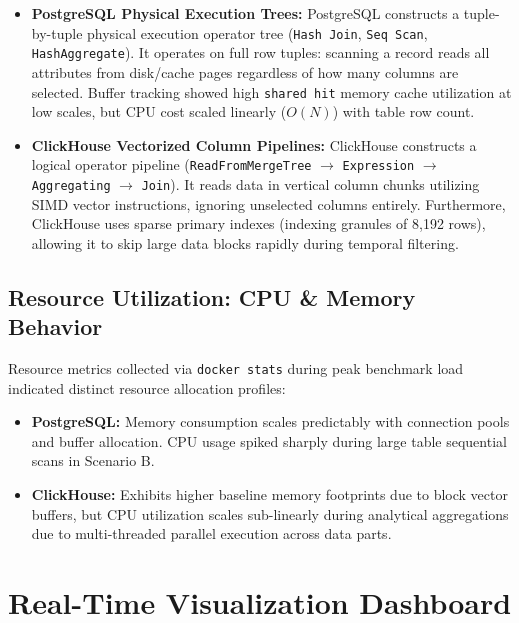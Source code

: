 \documentclass[peerreviewca]{IEEEtran}
\begin{document}
\begin{itemize}
    \item \textbf{PostgreSQL Physical Execution Trees:} PostgreSQL constructs a tuple-by-tuple physical execution operator tree (\texttt{Hash Join}, \texttt{Seq Scan}, \texttt{HashAggregate}). It operates on full row tuples: scanning a record reads all attributes from disk/cache pages regardless of how many columns are selected. Buffer tracking showed high \texttt{shared hit} memory cache utilization at low scales, but CPU cost scaled linearly ($O(N)$) with table row count.
    
    \item \textbf{ClickHouse Vectorized Column Pipelines:} ClickHouse constructs a logical operator pipeline (\texttt{ReadFromMergeTree} $\rightarrow$ \texttt{Expression} $\rightarrow$ \texttt{Aggregating} $\rightarrow$ \texttt{Join}). It reads data in vertical column chunks utilizing SIMD vector instructions, ignoring unselected columns entirely. Furthermore, ClickHouse uses sparse primary indexes (indexing granules of 8,192 rows), allowing it to skip large data blocks rapidly during temporal filtering.
\end{itemize}

\subsection{Resource Utilization: CPU \& Memory Behavior}
Resource metrics collected via \texttt{docker stats} during peak benchmark load indicated distinct resource allocation profiles:
\begin{itemize}
    \item \textbf{PostgreSQL:} Memory consumption scales predictably with connection pools and buffer allocation. CPU usage spiked sharply during large table sequential scans in Scenario B.
    \item \textbf{ClickHouse:} Exhibits higher baseline memory footprints due to block vector buffers, but CPU utilization scales sub-linearly during analytical aggregations due to multi-threaded parallel execution across data parts.
\end{itemize}

\section{Real-Time Visualization Dashboard}
\label{sec:dashboard}
\end{document}
